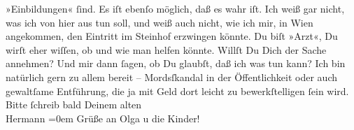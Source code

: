 \begin{ledgroupsized}[t]{13cm}
               »Einbildungen« ſind. Es iſt ebenſo möglich, daß es wahr iſt. Ich weiß gar nicht, was
               ich von hier aus tun soll, und weiß auch nicht, wie ich mir, in Wien angekommen, den Eintritt im Steinhof erzwingen könnte. Du biſt »Arzt«, Du wirſt eher wiſſen, ob und wie
               man helfen könnte. Willſt Du Dich der Sache annehmen? Und mir dann ſagen, ob Du
               glaubſt, daß ich was tun kann? Ich bin natürlich gern zu allem bereit – Mordsſkandal
               in der Öffentlichkeit oder auch gewaltſame Entführung, die ja mit Geld dort leicht zu
               bewerkſtelligen ſein wird. Bitte ſchreib bald\pend
           \pstart
           Deinem alten{\\[\baselineskip]}\spacefill\mbox{Hermann}\pend
           \leftskip=0em{}\pstart
           \noindent{}Grüße an Olga u die Kinder!\pend
           \endnumbering{}\end{ledgroupsized}  \newcommand{\dateiname}{L02121}\newcommand{\titel}{Hermann Bahr an Arthur Schnitzler, 16. 4. 1913}\newcommand{\editorInnen}{ Kurt Ifkovits,  Martin Anton Müller}
      